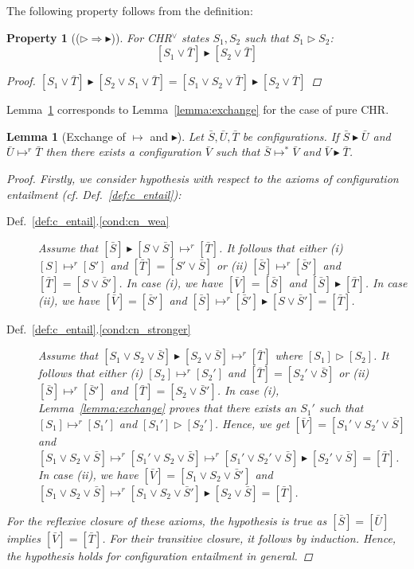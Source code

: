 \documentclass[acmtocl]{acmtrans2m}
\newtheorem{lemma}[theorem]{Lemma}
\newtheorem{property}[theorem]{Property}
\newcommand\ent{\rhd}
\newcommand\entv{\blacktriangleright}
\newcommand{\bS}{\bar{S}}
\newcommand{\bT}{\bar{T}}
\newcommand{\bU}{\bar{U}}
\newcommand{\bV}{\bar{V}}
\begin{document}
The following property follows from the definition:

\begin{property}[($\ent\Rightarrow\entv$)]
For CHR$^\vee$ states $S_1,S_2$ such that $S_1\ent S_2$:
\[
        [ S_1 \vee \bar T ]
          \entv
        [ S_2 \vee \bar T ]
\]
\begin{proof}
$[ S_1 \vee \bar T ]\entv[ S_2 \vee S_1 \vee \bar T ]=[ S_1 \vee S_2 \vee \bar T
]\entv[ S_2 \vee \bar T ]$
\end{proof}
\end{property}

Lemma~\ref{lemma:vee-exchange} corresponds to Lemma~\ref{lemma:exchange} for
the case of pure CHR.

\begin{lemma}[Exchange of $\mapsto$ and $\entv$]\label{lemma:vee-exchange}
  Let $\bS,\bU,\bT$ be configurations. If $\bS\entv
  \bU$ and $\bU\mapsto^r \bT$ then there exists a configuration $\bV$ such that
  $\bS\mapsto^{*} \bV$ and $\bV\entv \bT$.
\begin{proof}
Firstly, we consider hypothesis with respect to the axioms of configuration
entailment (cf. Def.~\ref{def:c_entail}):
\begin{description}
 \item [Def.~\ref{def:c_entail}.\ref{cond:cn_wea}]
	Assume that $[\bS]\entv[S\vee\bS]\mapsto^{r}[\bT]$. It follows that either (i)
	$[S]\mapsto^r [S']$ and $[\bT]=[S'\vee\bS]$ or (ii) $[\bS]\mapsto^r[\bS']$ and
	$[\bT]=[S\vee\bS']$. In case (i), we have $[\bV]=[\bS]$ and $[\bS] \entv [\bT]$.
	In case (ii), we have $[\bV]=[\bS']$ and $[\bS]\mapsto^r [\bS']\entv
	[S\vee\bS']=[\bT]$.
 \item [Def.~\ref{def:c_entail}.\ref{cond:cn_stronger}]
	Assume that $[S_1\vee S_2\vee\bS]\entv[S_2\vee\bS]\mapsto^{r}[\bT]$ where
	$[S_1]\ent [S_2]$. It follows that either (i) $[S_2]\mapsto^r [S_2']$ and
	$[\bT]=[S_2'\vee\bS]$ or (ii) $[\bS]\mapsto^r[\bS']$ and $[\bT]=[S_2\vee\bS']$.
	In case (i), Lemma~\ref{lemma:exchange} proves that there exists an $S_1'$ such
	that $[S_1]\mapsto^r [S_1']$ and $[S_1']\ent [S_2']$. Hence, we get
	$[\bV]=[S_1'\vee S_2'\vee\bS]$ and $[S_1\vee S_2\vee\bS]\mapsto^r [S_1'\vee
	S_2\vee\bS] \mapsto^r [S_1'\vee S_2'\vee\bS]\entv [S_2'\vee\bS]=[\bT]$. In case
	(ii), we have $[\bV]= [S_1\vee S_2\vee\bS']$ and $[S_1\vee S_2\vee\bS]\mapsto^r
	[S_1\vee S_2\vee\bS'] \entv [S_2\vee\bS]=[\bT]$.
\end{description}
For the reflexive closure of these axioms, the hypothesis is true as
$[\bS]=[\bU]$ implies $[\bV]=[\bT]$. For their transitive closure, it follows by
induction. Hence, the hypothesis holds for configuration entailment in general.
\end{proof}
\end{lemma}
\end{document}
